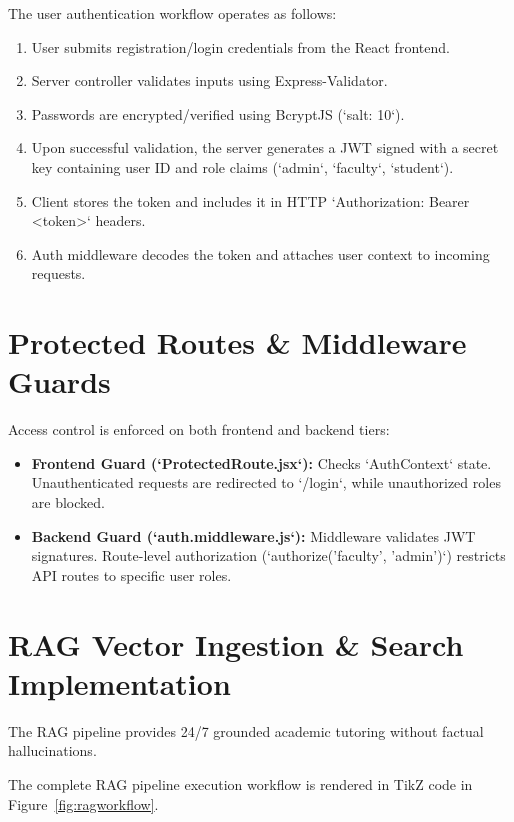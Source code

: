 The user authentication workflow operates as follows:

\begin{enumerate}
    \item User submits registration/login credentials from the React frontend.
    \item Server controller validates inputs using Express-Validator.
    \item Passwords are encrypted/verified using BcryptJS (`salt: 10`).
    \item Upon successful validation, the server generates a JWT signed with a secret key containing user ID and role claims (`admin`, `faculty`, `student`).
    \item Client stores the token and includes it in HTTP `Authorization: Bearer <token>` headers.
    \item Auth middleware decodes the token and attaches user context to incoming requests.
\end{enumerate}

\section{Protected Routes \& Middleware Guards}

Access control is enforced on both frontend and backend tiers:

\begin{itemize}
    \item \textbf{Frontend Guard (`ProtectedRoute.jsx`):} Checks `AuthContext` state. Unauthenticated requests are redirected to `/login`, while unauthorized roles are blocked.
    
    \item \textbf{Backend Guard (`auth.middleware.js`):} Middleware validates JWT signatures. Route-level authorization (`authorize('faculty', 'admin')`) restricts API routes to specific user roles.
\end{itemize}

\section{RAG Vector Ingestion \& Search Implementation}

The RAG pipeline provides 24/7 grounded academic tutoring without factual hallucinations.

The complete RAG pipeline execution workflow is rendered in TikZ code in Figure~\ref{fig:ragworkflow}.

